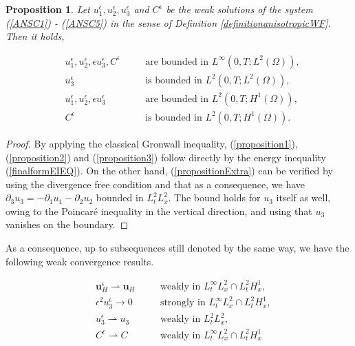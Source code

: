 \documentclass[11pt]{article}
\newtheorem{prop}{Proposition}
\begin{document}
  \begin{prop}
    Let $u^\epsilon_1, u^\epsilon_2, u^\epsilon_3$ and $C^\epsilon$ be the weak solutions of the system (\ref{ANSC1}) - (\ref{ANSC5}) in the sense of Definition \ref{definitionanisotropicWF}. Then it holds,
    
    \begin{align}
      & u^\epsilon_1, u^\epsilon_2, \epsilon u^\epsilon_3, C^\epsilon & \quad & \text{are bounded in $L^\infty (0,T; L^2(\Omega)),$} \label{proposition1} \\
      & u^\epsilon_3 & \quad & \text{is bounded in $L^2 (0,T; L^2(\Omega)),$} \label{propositionExtra} \\
      & u^\epsilon_1, u^\epsilon_2, \epsilon u^\epsilon_3 & \quad & \text{are bounded in $L^2(0,T; H^1(\Omega)),$} \label{proposition2} \\
      & C^\epsilon & \quad & \text{is bounded in $L^2(0,T;H^1(\Omega)).$} \label{proposition3}
    \end{align}
    
  \end{prop}
  
  \begin{proof}
  By applying the classical Gronwall inequality, (\ref{proposition1}), (\ref{proposition2}) and (\ref{proposition3}) follow directly by the energy inequality (\ref{finalformEIEQ}). On the other hand, (\ref{propositionExtra}) can be verified by using the divergence free condition and that as a consequence, we have $\partial_3 u_3 = - \partial_1 u_1 - \partial_2 u_2$ bounded in $L^2_t L^2 _x$. The bound holds for $u_3$ itself as well, owing to the Poincar\'e inequality in the vertical direction, and using that $u_3$ vanishes on the boundary.
  \end{proof}
  
  As a consequence, up to subsequences still denoted by the same way, we have the following weak convergence results.
  
  \begin{align} 
    &  \mathbf{u}_H^\epsilon \rightharpoonup \mathbf{u}_H &\quad & \text{weakly in $L_t^\infty L_x^2 \cap L_t^2 H_x^1$,} \label{WeakConvUHEps} \\
    &  \epsilon^2 u_3^\epsilon \to 0 &\quad & \text{strongly in $L_t^\infty L_x^2 \cap L_t^2 H_x^1$,} \label{WeakConvU3Eps} \\ 
    & u_3^\epsilon \rightharpoonup u_3  &\quad & \text{weakly in $L_t^2 L_x^2$,} \label{WeakConvU3NoEps} \\
    & C^\epsilon \rightharpoonup C &\quad & \text{weakly in $L_t^\infty L_x^2 \cap L_t^2 H_x^1$} \label{WeakConvCEps1}
  \end{align} 
\end{document}
